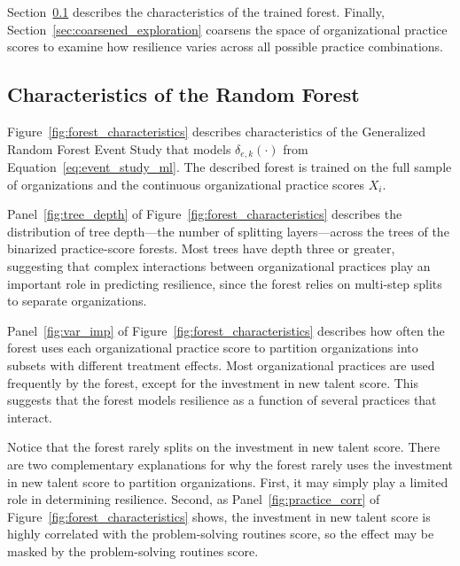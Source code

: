 \documentclass[12pt,notitlepage]{article}
\begin{document}
Section~\ref{sec:forest_chars} describes the characteristics of the trained forest.
Finally, Section~\ref{sec:coarsened_exploration} coarsens the  space of organizational practice scores to examine how resilience varies across all possible practice combinations.

\subsection{Characteristics of the Random Forest}\label{sec:forest_chars}

Figure~\ref{fig:forest_characteristics} describes characteristics of the Generalized Random Forest Event Study that models $\delta_{e, k}(\cdot)$ from Equation~\ref{eq:event_study_ml}. 
The described forest is trained on the full sample of organizations and the continuous organizational practice scores $X_i$. 

Panel~\ref{fig:tree_depth} of Figure~\ref{fig:forest_characteristics} describes the distribution of tree depth---the number of splitting layers---across the trees of the binarized practice-score forests.
Most trees have depth three or greater, suggesting that complex interactions between organizational practices play an important role in predicting resilience, since the forest relies on multi-step splits to separate organizations.


Panel~\ref{fig:var_imp} of Figure~\ref{fig:forest_characteristics} describes how often the forest uses each organizational practice score to partition organizations into subsets with different treatment effects. 
Most organizational practices are used frequently by the forest, except for the investment in new talent score.
This suggests that the forest models resilience as a function of several practices that interact. 

Notice that the forest rarely splits on the investment in new talent score. 
There are two complementary explanations for why the forest rarely uses the investment in new talent score to partition organizations. 
First, it may simply play a limited role in determining resilience. 
Second, as Panel~\ref{fig:practice_corr} of Figure~\ref{fig:forest_characteristics} shows, the investment in new talent score is highly correlated with the problem-solving routines score, so the effect may be masked by the problem-solving routines score.
\end{document}
